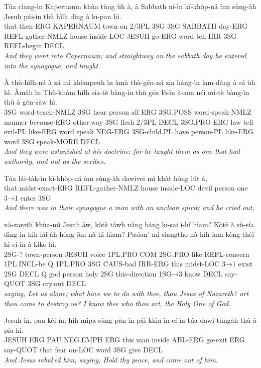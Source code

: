 \documentclass[11pt,a4paper]{article}
\begin{document}
\begin{exe}
\gll Túa cìang-ìn Kapernaum khùa tùng ùh à, à Sabbath nì-ìn kī-khòp-ná ínn sùng-àh Jesuh pái-ìn thù hìlh dìng à kī-pan hì. \\
     that then-ERG KAPERNAUM town on 2/3PL 3SG 3SG SABBATH day-ERG REFL-gather-NMLZ house inside-LOC JESUH go-ERG word tell IRR 3SG REFL-begin DECL \\
\glt \textcolor{kjvcolor}{\textit{And they went into Capernaum; and straightway on the sabbath day he entered into the synagogue, and taught.}}

\gll À thù-hìlh-ná à zá mì khèmpeuh ìn àmà thù-gēn-ná zia hàng-ìn lam-dàng à sá ùh hì. Àmàh ìn Thù-khàm hìlh sía-tè bàng-ìn thù gēn lò-ìn à-ana néi mì-tè bàng-ìn thù à gēn-zàw hì. \\
     3SG word-teach-NMLZ 3SG hear person all ERG 3SG.POSS word-speak-NMLZ manner because-ERG other.way 3SG flesh 2/3PL DECL 3SG.PRO ERG law tell evil-PL like-ERG word speak NEG-ERG 3SG-child.PL have person-PL like-ERG word 3SG speak-MORE DECL \\
\glt \textcolor{kjvcolor}{\textit{And they were astonished at his doctrine: for he taught them as one that had authority, and not as the scribes.}}

\gll Túa lái-tàk-ìn kī-khòp-ná ínn sùng-àh dawivei mì khàt hòng lút à, \\
     that midst-exact-ERG REFL-gather-NMLZ house inside-LOC devil person one 3→1 enter 3SG \\
\glt \textcolor{kjvcolor}{\textit{And there was in their synagogue a man with an unclean spirit; and he cried out,}}

\gll nà-zareth khùa-mì Jesuh àw, kòtè tàwh nàng bàng kī-sāi ì-hí hìam? Kòtè à sù-sía dìng-ìn híh lái-àh hòng ōm nà hì hìam? Pasian' mì sìangtho nà híh-lam kòng théi hì cí-ìn à kiko hì. \\
     2SG-? town-person JESUH voice 1PL.PRO COM 2SG.PRO like REFL-concern 1PL.INCL-be Q 1PL.PRO 3SG CAUS-bad IRR-ERG this midst-LOC 3→1 exist 2SG DECL Q god person holy 2SG this-direction 1SG→3 know DECL say-QUOT 3SG cry.out DECL \\
\glt \textcolor{kjvcolor}{\textit{saying, Let us alone; what have we to do with thee, thou Jesus of Nazareth? art thou come to destroy us? I know thee who thou art, the Holy One of God.}}

\gll Jesuh ìn, pau kèi ìn; híh mipa sùng pàn-ìn pái-khìa ìn cí-ìn túa dawi tùngàh thù à pía hì. \\
     JESUH ERG PAU NEG.EMPH ERG this man inside ABL-ERG go-exit ERG say-QUOT that fear on-LOC word 3SG give DECL \\
\glt \textcolor{kjvcolor}{\textit{And Jesus rebuked him, saying, Hold thy peace, and come out of him.}}


\end{exe}
\end{document}
